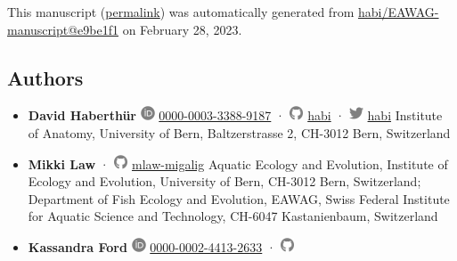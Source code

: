 This manuscript
(\href{https://habi.github.io/EAWAG-manuscript/v/e9be1f19a7a3e08520efc834431cde4dfe4c4d4a/}{permalink})
was automatically generated
from \href{https://github.com/habi/EAWAG-manuscript/tree/e9be1f19a7a3e08520efc834431cde4dfe4c4d4a}{habi/EAWAG-manuscript@e9be1f1}
on February 28, 2023.

\hypertarget{authors}{%
\subsection{Authors}\label{authors}}

\begin{itemize}
\item
  \textbf{David Haberthür}
  \includegraphics[width=0.16667in,height=0.16667in]{images/orcid.svg}
  \href{https://orcid.org/0000-0003-3388-9187}{0000-0003-3388-9187}
  · \includegraphics[width=0.16667in,height=0.16667in]{images/github.svg}
  \href{https://github.com/habi}{habi}
  · \includegraphics[width=0.16667in,height=0.16667in]{images/twitter.svg}
  \href{https://twitter.com/habi}{habi}
  Institute of Anatomy, University of Bern, Baltzerstrasse 2, CH-3012 Bern, Switzerland
\item
  \textbf{Mikki Law}
  · \includegraphics[width=0.16667in,height=0.16667in]{images/github.svg}
  \href{https://github.com/mlaw-migalig}{mlaw-migalig}
  Aquatic Ecology and Evolution, Institute of Ecology and Evolution, University of Bern, CH-3012 Bern, Switzerland; Department of Fish Ecology and Evolution, EAWAG, Swiss Federal Institute for Aquatic Science and Technology, CH-6047 Kastanienbaum, Switzerland
\item
  \textbf{Kassandra Ford}
  \includegraphics[width=0.16667in,height=0.16667in]{images/orcid.svg}
  \href{https://orcid.org/0000-0002-4413-2633}{0000-0002-4413-2633}
  · \includegraphics[width=0.16667in,height=0.16667in]{images/github.svg}

\end{itemize}
